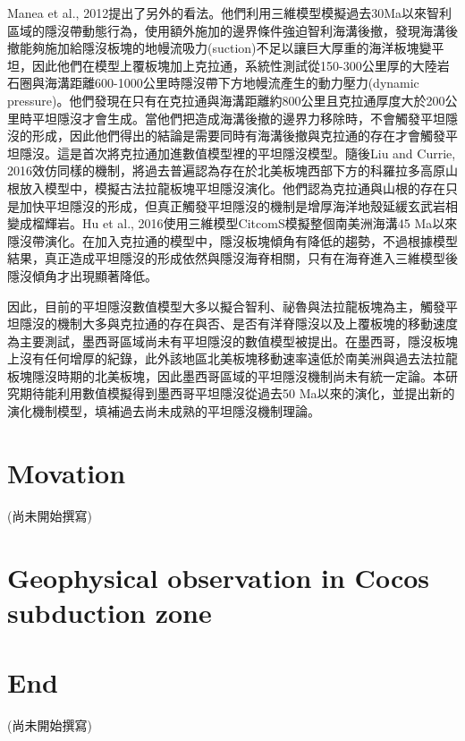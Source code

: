 Manea et al., 2012提出了另外的看法。他們利用三維模型模擬過去30Ma以來智利區域的隱沒帶動態行為，使用額外施加的邊界條件強迫智利海溝後撤，發現海溝後撤能夠施加給隱沒板塊的地幔流吸力(suction)不足以讓巨大厚重的海洋板塊變平坦，因此他們在模型上覆板塊加上克拉通，系統性測試從150-300公里厚的大陸岩石圈與海溝距離600-1000公里時隱沒帶下方地幔流產生的動力壓力(dynamic pressure)。他們發現在只有在克拉通與海溝距離約800公里且克拉通厚度大於200公里時平坦隱沒才會生成。當他們把造成海溝後撤的邊界力移除時，不會觸發平坦隱沒的形成，因此他們得出的結論是需要同時有海溝後撤與克拉通的存在才會觸發平坦隱沒。這是首次將克拉通加進數值模型裡的平坦隱沒模型。隨後Liu and Currie, 2016效仿同樣的機制，將過去普遍認為存在於北美板塊西部下方的科羅拉多高原山根放入模型中，模擬古法拉龍板塊平坦隱沒演化。他們認為克拉通與山根的存在只是加快平坦隱沒的形成，但真正觸發平坦隱沒的機制是增厚海洋地殼延緩玄武岩相變成榴輝岩。Hu et al., 2016使用三維模型CitcomS模擬整個南美洲海溝45 Ma以來隱沒帶演化。在加入克拉通的模型中，隱沒板塊傾角有降低的趨勢，不過根據模型結果，真正造成平坦隱沒的形成依然與隱沒海脊相關，只有在海脊進入三維模型後隱沒傾角才出現顯著降低。

因此，目前的平坦隱沒數值模型大多以擬合智利、祕魯與法拉龍板塊為主，觸發平坦隱沒的機制大多與克拉通的存在與否、是否有洋脊隱沒以及上覆板塊的移動速度為主要測試，墨西哥區域尚未有平坦隱沒的數值模型被提出。在墨西哥，隱沒板塊上沒有任何增厚的紀錄，此外該地區北美板塊移動速率遠低於南美洲與過去法拉龍板塊隱沒時期的北美板塊，因此墨西哥區域的平坦隱沒機制尚未有統一定論。本研究期待能利用數值模擬得到墨西哥平坦隱沒從過去50 Ma以來的演化，並提出新的演化機制模型，填補過去尚未成熟的平坦隱沒機制理論。

\section{Movation}

(尚未開始撰寫)

\section{Geophysical observation in Cocos subduction zone}

\section{End}

(尚未開始撰寫)